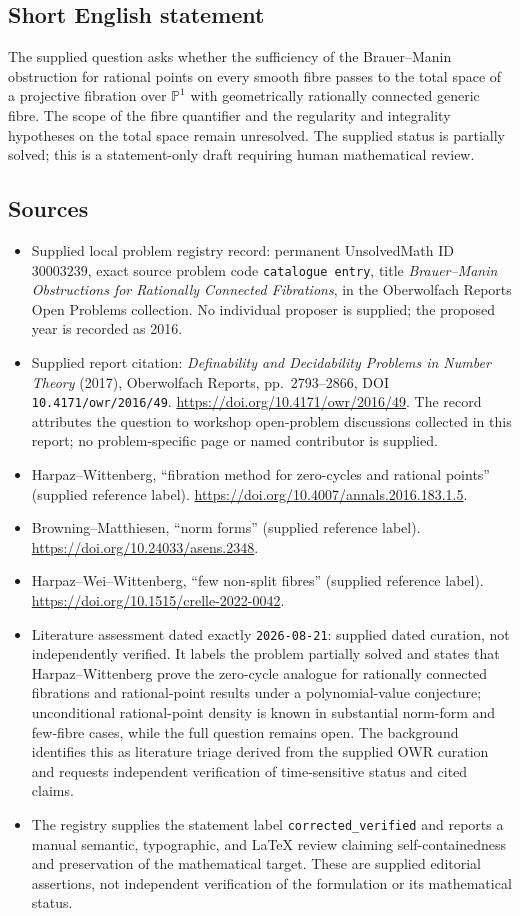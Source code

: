 \documentclass[11pt]{article}
\begin{document}
\subsection{Short English statement}
The supplied question asks whether the sufficiency of the Brauer--Manin obstruction for rational points on every smooth fibre passes to the total space of a projective fibration over \(\mathbb P^1\) with geometrically rationally connected generic fibre. The scope of the fibre quantifier and the regularity and integrality hypotheses on the total space remain unresolved. The supplied status is partially solved; this is a statement-only draft requiring human mathematical review.
\subsection{Sources}
\begin{itemize}
\item Supplied local problem registry record: permanent UnsolvedMath ID \(30003239\), exact source problem code \texttt{catalogue entry}, title \emph{Brauer--Manin Obstructions for Rationally Connected Fibrations}, in the Oberwolfach Reports Open Problems collection. No individual proposer is supplied; the proposed year is recorded as 2016.
\item Supplied report citation: \emph{Definability and Decidability Problems in Number Theory} (2017), Oberwolfach Reports, pp.~2793--2866, DOI \texttt{10.4171/owr/2016/49}. \url{https://doi.org/10.4171/owr/2016/49}. The record attributes the question to workshop open-problem discussions collected in this report; no problem-specific page or named contributor is supplied.
\item Harpaz--Wittenberg, ``fibration method for zero-cycles and rational points'' (supplied reference label). \url{https://doi.org/10.4007/annals.2016.183.1.5}.
\item Browning--Matthiesen, ``norm forms'' (supplied reference label). \url{https://doi.org/10.24033/asens.2348}.
\item Harpaz--Wei--Wittenberg, ``few non-split fibres'' (supplied reference label). \url{https://doi.org/10.1515/crelle-2022-0042}.
\item Literature assessment dated exactly \texttt{2026-08-21}: supplied dated curation, not independently verified. It labels the problem partially solved and states that Harpaz--Wittenberg prove the zero-cycle analogue for rationally connected fibrations and rational-point results under a polynomial-value conjecture; unconditional rational-point density is known in substantial norm-form and few-fibre cases, while the full question remains open. The background identifies this as literature triage derived from the supplied OWR curation and requests independent verification of time-sensitive status and cited claims.
\item The registry supplies the statement label \texttt{corrected\_verified} and reports a manual semantic, typographic, and LaTeX review claiming self-containedness and preservation of the mathematical target. These are supplied editorial assertions, not independent verification of the formulation or its mathematical status.
\end{itemize}
\end{document}
